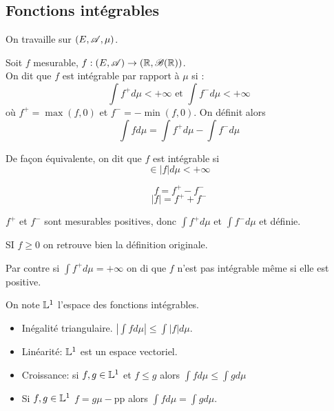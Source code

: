 \subsection{Fonctions intégrables}

On travaille sur $(E, \mathscr{A}, \mu)$.

\begin{definition}
	Soit $f$ mesurable, $f : (E, \mathscr{A}) \to (\mathbb{R}, \mathscr{B}(\mathbb{R}))$.\\
	On dit que $f$ est intégrable par rapport à $\mu$ si :
	$$\int f^+ d\mu < +\infty \text{ et } \int f^- d\mu < +\infty$$
	où $f^+ = \max(f,0)$ et $f^- = -\min(f,0)$.
	On définit alors
	$$ \int f d\mu = \int f^+ d\mu - \int f^- d\mu $$
\end{definition}

\begin{remarque}
	De façon équivalente, on dit que $f$ est intégrable si
	$$ \in |f| d\mu < +\infty$$
\end{remarque}

\begin{remarque}
	$$ f = f^+ - f^- $$
	$$ |f| = f^+ + f^- $$
\end{remarque}

\begin{remarque}
	$f^+$ et $f^-$ sont mesurables positives, donc $\int f^+d\mu$ et $\int f^- d\mu$ et définie.
\end{remarque}

\begin{remarque}
	SI $f \geq 0$ on retrouve bien la définition originale.
\end{remarque}

\begin{remarque}
	Par contre si $\int f^+ d\mu = +\infty$ on di que $f$ n'est pas intégrable même si elle est positive.
\end{remarque}


\begin{definition}
	On note $\mathbb{L}^1$ l'espace des fonctions intégrables.
\end{definition}

\begin{prop}
	\begin{itemize}
		\item Inégalité triangulaire. $\left| \int f d\mu \right| \leq \int |f| d \mu$.
		\item Linéarité: $\mathbb{L}^1$ est un espace vectoriel.
		\item Croissance: si $f,g \in \mathbb{L}^1$ et $f\leq g$ alors $\int f d\mu \leq \int g d\mu$
		\item Si $f,g \in \mathbb{L}^1$ $f = g \mu-$pp alors $\int f d\mu = \int g d\mu$.
	\end{itemize}
\end{prop}

